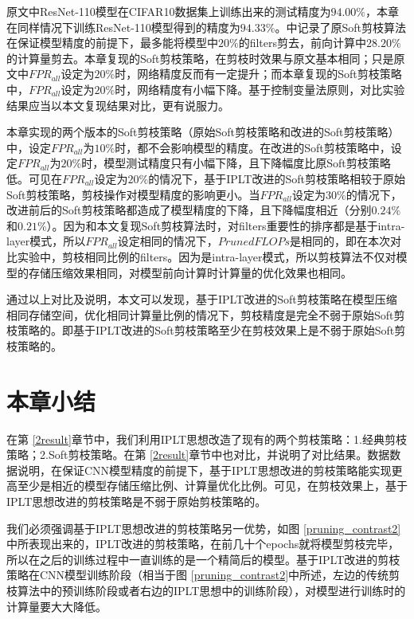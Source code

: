 \documentclass[ pdftex, oneside, master]{NJUthesis}
\begin{document}
\cite{27}原文中ResNet-110模型在CIFAR10数据集上训练出来的测试精度为$94.00\%$，本章在同样情况下训练ResNet-110模型得到的精度为$94.33\%$。\cite{27}中记录了原Soft剪枝算法在保证模型精度的前提下，最多能将模型中$20\%$的filters剪去，前向计算中$28.20\%$的计算量剪去。本章复现的Soft剪枝策略，在剪枝时效果与原文基本相同；只是原文中$FPR_{all}$设定为$20\%$时，网络精度反而有一定提升；而本章复现的Soft剪枝策略中，$FPR_{all}$设定为$20\%$时，网络精度有小幅下降。基于控制变量法原则，对比实验结果应当以本文复现结果对比，更有说服力。

本章实现的两个版本的Soft剪枝策略（原始Soft剪枝策略和改进的Soft剪枝策略）中，设定$FPR_{all}$为$10\%$时，都不会影响模型的精度。在改进的Soft剪枝策略中，设定$FPR_{all}$为$20\%$时，模型测试精度只有小幅下降，且下降幅度比原Soft剪枝策略低。可见在$FPR_ {all}$设定为$20\%$的情况下，基于IPLT改进的Soft剪枝策略相较于原始Soft剪枝策略，剪枝操作对模型精度的影响更小。当$FPR_ {all}$设定为$30\%$的情况下，改进前后的Soft剪枝策略都造成了模型精度的下降，且下降幅度相近（分别$0.24\%$和$0.21\%$）。因为\cite{27}和本文复现Soft剪枝算法时，对filters重要性的排序都是基于intra-layer模式，所以$FPR_ {all}$设定相同的情况下，$Pruned FLOPs$是相同的，即在本次对比实验中，剪枝相同比例的filters。因为是intra-layer模式，所以剪枝算法不仅对模型的存储压缩效果相同，对模型前向计算时计算量的优化效果也相同。

通过以上对比及说明，本文可以发现，基于IPLT改进的Soft剪枝策略在模型压缩相同存储空间，优化相同计算量比例的情况下，剪枝精度是完全不弱于原始Soft剪枝策略的。即基于IPLT改进的Soft剪枝策略至少在剪枝效果上是不弱于原始Soft剪枝策略的。

\section{本章小结}

在第 \ref{2result}章节中，我们利用IPLT思想改造了现有的两个剪枝策略：1.经典剪枝策略\cite{17}；2.Soft剪枝策略\cite{27}。在第 \ref{2result}章节中也对比，并说明了对比结果。数据数据说明，在保证CNN模型精度的前提下，基于IPLT思想改进的剪枝策略能实现更高至少是相近的模型存储压缩比例、计算量优化比例。可见，在剪枝效果上，基于IPLT思想改进的剪枝策略是不弱于原始剪枝策略的。

我们必须强调基于IPLT思想改进的剪枝策略另一优势，如图 \ref{pruning_contrast2}中所表现出来的，IPLT改进的剪枝策略，在前几十个epochs就将模型剪枝完毕，所以在之后的训练过程中一直训练的是一个精简后的模型。基于IPLT改进的剪枝策略在CNN模型训练阶段（相当于图 \ref{pruning_contrast2}中所述，左边的传统剪枝算法中的预训练阶段或者右边的IPLT思想中的训练阶段），对模型进行训练时的计算量要大大降低。
\end{document}
